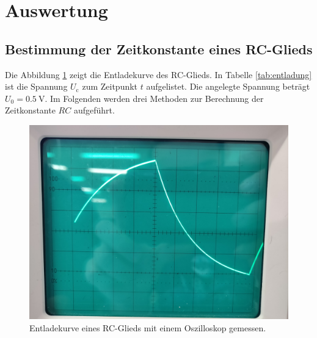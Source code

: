 \section{Auswertung}
\label{sec:Auswertung}

\subsection{Bestimmung der Zeitkonstante eines RC-Glieds}
Die Abbildung \ref{fig:entladung} zeigt die Entladekurve des RC-Glieds.
In Tabelle \ref{tab:entladung} ist die Spannung $U_\text{c}$ zum Zeitpunkt $t$ aufgelistet.
Die angelegte Spannung beträgt $U_0 = \SI{0.5}{\volt}$. Im Folgenden werden drei Methoden
zur Berechnung der Zeitkonstante $RC$ aufgeführt.
\begin{figure}
    \label{fig:entladung}
    \centering
    \includegraphics[width=\textwidth]{content/data/entlade.jpg}
    \caption{Entladekurve eines RC-Glieds mit einem Oszilloskop gemessen.}
\end{figure}
